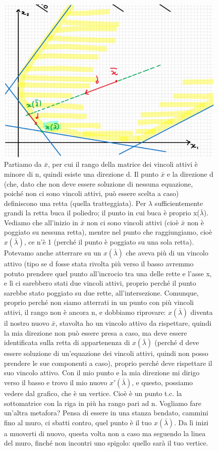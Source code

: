 \begin{figure}[h!]
    \centering
    \includegraphics[scale=0.5]{costruzionevertice.png}
    \caption{Partiamo da $\bar{x}$, per cui il rango della matrice dei vincoli attivi è minore di n, quindi esiste una direzione d. Il punto $\bar{x}$ e la direzione d (che, dato che non deve essere soluzione di nessuna equazione, poiché non ci sono vincoli attivi, può essere scelta a caso) definiscono una retta (quella tratteggiata). Per $\lambda$ sufficientemente grandi la retta buca il poliedro; il punto in cui buca è proprio x($\bar{\lambda}$). Vediamo che all'inizio in $\bar{x}$ non ci sono vincoli attivi (cioè $\bar{x}$ non è poggiato su nessuna retta), mentre nel punto che raggiungiamo, cioè $x(\bar{\lambda})$, ce n'è 1 (perché il punto è poggiato su una sola retta). Potevamo anche atterrare su un $x(\bar{\lambda})$ che aveva più di un vincolo attivo (tipo se d fosse stata rivolta più verso il basso avremmo potuto prendere quel punto all'incrocio tra una delle rette e l'asse x, e lì ci sarebbero stati due vincoli attivi, proprio perché il punto sarebbe stato poggiato su due rette, all'intersezione. Comunque, proprio perché non siamo atterrati in un punto con più vincoli attivi, il rango non è ancora n, e dobbiamo riprovare: $x(\bar{\lambda})$ diventa il nostro nuovo $\bar{x}$, stavolta ho un vincolo attivo da rispettare, quindi la mia direzione non può essere presa a caso, ma deve essere identificata sulla retta di appartenenza di $x(\bar{\lambda})$ (perché d deve essere soluzione di un'equazione dei vincoli attivi, quindi non posso prendere le sue componenti a caso), proprio perché deve rispettare il suo vincolo attivo. Con il mio punto e la mia direzione mi dirigo verso il basso e trovo il mio nuovo $x'(\bar{\lambda})$, e questo, possiamo vedere dal grafico, che è un vertice. Cioè è un punto t.c. la sottomatrice con la riga in più ha rango pari ad n. Vogliamo fare un'altra metafora? Pensa di essere in una stanza bendato, cammini fino al muro, ci sbatti contro, quel punto è il tuo $x(\bar{\lambda})$. Da lì inizi a muoverti di nuovo, questa volta non a caso ma seguendo la linea del muro, finché non incontri uno spigolo: quello sarà il tuo vertice.}
\end{figure}
